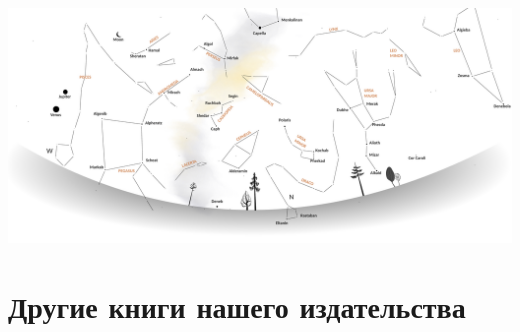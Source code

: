 \documentclass[a5paper,11pt]{memoir}
\newif\ifincludetranslations
\begin{document}
\vfill
\vspace{100pt}   %

\hspace{-1.70cm}
\includegraphics[width=\paperwidth]{images/stars-annotated.pdf} 

\clearpage


\ifincludetranslations
	\clearpage
	
\fi


\cleartoverso
\thispagestyle{empty}  %


\section*{Другие книги нашего издательства}
\end{document}
